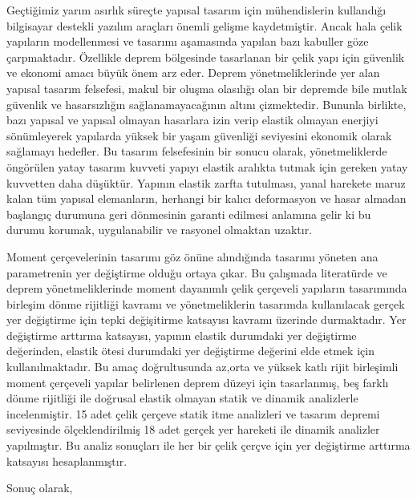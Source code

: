 Geçtiğimiz yarım asırlık süreçte yapısal tasarım için mühendislerin
kullandığı bilgisayar destekli yazılım araçları önemli gelişme kaydetmiştir.
Ancak hala çelik yapıların modellenmesi ve tasarımı aşamasında yapılan
bazı kabuller göze çarpmaktadır. Özellikle deprem bölgesinde tasarlanan
bir çelik yapı için güvenlik ve ekonomi amacı büyük önem arz eder.
Deprem yönetmeliklerinde yer alan yapısal tasarım felsefesi, makul
bir oluşma olasılığı olan bir depremde bile mutlak güvenlik ve hasarsızlığın
sağlanamayacağının altını çizmektedir. Bununla birlikte, bazı yapısal
ve yapısal olmayan hasarlara izin verip elastik olmayan enerjiyi sönümleyerek
yapılarda yüksek bir yaşam güvenliği seviyesini ekonomik olarak sağlamayı
hedefler. Bu tasarım felsefesinin bir sonucu olarak, yönetmeliklerde
öngörülen yatay tasarım kuvveti yapıyı elastik aralıkta tutmak için
gereken yatay kuvvetten daha düşüktür. Yapının elastik zarfta tutulması,
yanal harekete maruz kalan tüm yapısal elemanların, herhangi bir kalıcı
deformasyon ve hasar almadan başlangıç durumuna geri dönmesinin garanti
edilmesi anlamına gelir ki bu durumu korumak, uygulanabilir ve rasyonel
olmaktan uzaktır.

Moment çerçevelerinin tasarımı göz önüne alındığında tasarımı yöneten
ana parametrenin yer değiştirme olduğu ortaya çıkar. Bu çalışmada
literatürde ve deprem yönetmeliklerinde moment dayanımlı çelik çerçeveli
yapıların tasarımında birleşim dönme rijitliği kavramı ve yönetmeliklerin
tasarımda kullanılacak gerçek yer değiştirme için tepki değişitirme
katsayısı kavramı üzerinde durmaktadır. Yer değiştirme arttırma katsayısı,
yapının elastik durumdaki yer değiştirme değerinden, elastik ötesi
durumdaki yer değiştirme değerini elde etmek için kullanılmaktadır.
Bu amaç doğrultusunda az,orta ve yüksek katlı rijit birleşimli moment
çerçeveli yapılar belirlenen deprem düzeyi için tasarlanmış, beş farklı
dönme rijitliği ile doğrusal elastik olmayan statik ve dinamik analizlerle
incelenmiştir. 15 adet çelik çerçeve statik itme analizleri ve tasarım
depremi seviyesinde ölçeklendirilmiş 18 adet gerçek yer hareketi ile
dinamik analizler yapılmıştır. Bu analiz sonuçları ile her bir çelik
çerçve için yer değiştirme arttırma katsayısı hesaplanmıştır.

Sonuç olarak,
